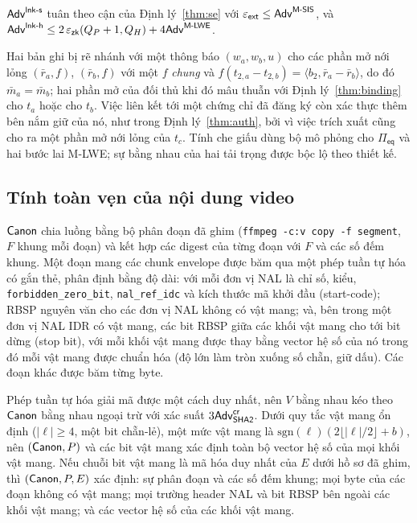\begin{theorem}
\label{thm:link}
$\mathsf{Adv}^{\mathsf{lnk\text{-}s}}$ tuân theo cận của Định lý~\ref{thm:se} với
$\varepsilon_{\mathsf{ext}}\le\mathsf{Adv}^{\textsf{M-SIS}}$, và
$\mathsf{Adv}^{\mathsf{lnk\text{-}h}}\le2\,\varepsilon_{\mathsf{zk}}(Q_P+1,Q_H)+4\mathsf{Adv}^{\textsf{M-LWE}}$.
\end{theorem}
\noindent
Hai bản ghi bị rẽ nhánh với một thông báo $(w_a,w_b,u)$ cho các phần mở nới lỏng
$(\bar r_a,f)$, $(\bar r_b,f)$ với một $f$ \emph{chung} và
$f(t_{2,a}-t_{2,b})=\langle b_2,\bar r_a-\bar r_b\rangle$, do đó
$\bar m_a=\bar m_b$; hai phần mở của đối thủ khi đó mâu thuẫn với
Định lý~\ref{thm:binding} cho $t_a$ hoặc cho $t_b$. Việc liên kết tới một chứng
chỉ đã đăng ký còn xác thực thêm bên nắm giữ của nó, như trong
Định lý~\ref{thm:auth}, bởi vì việc trích xuất cũng cho ra một phần mở nới lỏng
của $t_c$. Tính che giấu dùng bộ mô phỏng cho $\Pi_{\mathsf{eq}}$ và hai bước
lai M-LWE; sự bằng nhau của hai tải trọng được bộc lộ theo thiết kế.

\subsection{Tính toàn vẹn của nội dung video}
\label{sec:sec-integrity}

$\mathsf{Canon}$ chia luồng bằng bộ phân đoạn đã ghim (\texttt{ffmpeg -c:v copy
-f segment}, $F$ khung mỗi đoạn) và kết hợp các digest của từng đoạn với
$F$ và các số đếm khung. Một đoạn mang các chunk envelope được băm qua một phép
tuần tự hóa có gắn thẻ, phân định bằng độ dài: với mỗi đơn vị NAL là chỉ số,
kiểu, \texttt{forbidden\_zero\_bit}, \texttt{nal\_ref\_idc} và kích thước mã
khởi đầu (start-code); RBSP nguyên văn cho các đơn vị NAL không có vật mang; và,
bên trong một đơn vị NAL IDR có vật mang, các bit RBSP giữa các khối vật mang
cho tới bit dừng (stop bit), với mỗi khối vật mang được thay bằng vector hệ số
của nó trong đó mỗi vật mang được chuẩn hóa (độ lớn làm tròn xuống số chẵn, giữ
dấu). Các đoạn khác được băm từng byte.

\begin{lemma}
\label{lem:canon}
Phép tuần tự hóa giải mã được một cách duy nhất, nên $V$ bằng nhau kéo theo
$\mathsf{Canon}$ bằng nhau ngoại trừ với xác suất $3\mathsf{Adv}^{\mathsf{cr}}_{\mathsf{SHA2}}$.
Dưới quy tắc vật mang ổn định ($|\ell|\ge4$, một bit chẵn-lẻ), một mức vật mang
là $\mathrm{sgn}(\ell)(2\lfloor|\ell|/2\rfloor+b)$, nên $(\mathsf{Canon},P)$ và các bit
vật mang xác định toàn bộ vector hệ số của mọi khối vật mang. Nếu chuỗi bit vật
mang là mã hóa duy nhất của $E$ dưới hồ sơ đã ghim, thì $(\mathsf{Canon},P,E)$ xác định:
sự phân đoạn và các số đếm khung; mọi byte của các đoạn không có vật mang; mọi
trường header NAL và bit RBSP bên ngoài các khối vật mang; và các vector hệ số
của các khối vật mang.
\end{lemma}

